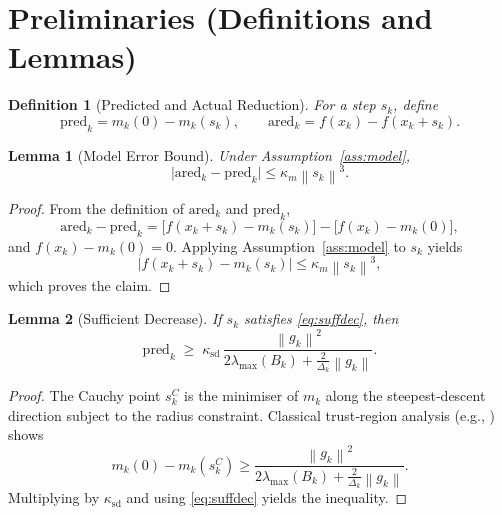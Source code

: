 \documentclass{article}
\newtheorem{lemma}{Lemma}
\newtheorem{definition}{Definition}
\newcommand{\norm}[1]{\left\lVert#1\right\rVert}
\begin{document}
\newpage
\section*{Preliminaries (Definitions and Lemmas)}

\begin{definition}[Predicted and Actual Reduction]
For a step $s_{k}$, define
\[
\text{pred}_{k}=m_{k}(0)-m_{k}(s_{k}),\qquad
\text{ared}_{k}=f(x_{k})-f(x_{k}+s_{k}).
\]
\end{definition}

\begin{lemma}[Model Error Bound]\label{lem:model}
Under Assumption~\ref{ass:model},
\[
\bigl|\text{ared}_{k}-\text{pred}_{k}\bigr|
\le \kappa_{m}\norm{s_{k}}^{3}.
\]
\end{lemma}
\begin{proof}
From the definition of $\text{ared}_{k}$ and $\text{pred}_{k}$,
\[
\text{ared}_{k}-\text{pred}_{k}
= \bigl[f(x_{k}+s_{k})-m_{k}(s_{k})\bigr]-\bigl[f(x_{k})-m_{k}(0)\bigr],
\]
and $f(x_{k})-m_{k}(0)=0$. Applying Assumption~\ref{ass:model} to $s_{k}$ yields
\[
|f(x_{k}+s_{k})-m_{k}(s_{k})|\le\kappa_{m}\norm{s_{k}}^{3},
\]
which proves the claim. \hfill\qedsymbol
\end{proof}

\begin{lemma}[Sufficient Decrease]\label{lem:suff}
If $s_{k}$ satisfies \eqref{eq:suffdec}, then
\[
\text{pred}_{k}\;\ge\;\kappa_{\mathrm{sd}}\,
\frac{\norm{g_{k}}^{2}}{2\lambda_{\max}(B_{k})+\frac{2}{\Delta_{k}}\norm{g_{k}}}.
\]
\end{lemma}
\begin{proof}
The Cauchy point $s_{k}^{C}$ is the minimiser of $m_{k}$ along the steepest‑descent direction subject to the radius constraint. Classical trust‑region analysis (e.g., \cite{Nocedal2006}) shows
\[
m_{k}(0)-m_{k}(s_{k}^{C})\ge
\frac{\norm{g_{k}}^{2}}{2\lambda_{\max}(B_{k})+\frac{2}{\Delta_{k}}\norm{g_{k}}}.
\]
Multiplying by $\kappa_{\mathrm{sd}}$ and using \eqref{eq:suffdec} yields the inequality. \hfill\qedsymbol
\end{proof}
\end{document}
